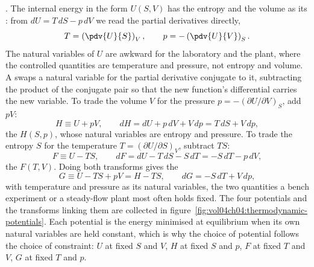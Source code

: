 . The internal energy in
the form $U(S,V)$ has the entropy and the volume as its : from $dU = T\,dS - p\,dV$ we read the partial derivatives directly,
\[
T = \left(\pdv{U}{S}\right)_V, \qquad
p = -\left(\pdv{U}{V}\right)_S.
\]
The natural variables of $U$ are awkward for the laboratory and the plant, where
the controlled quantities are temperature and pressure, not entropy and volume.
A  swaps a natural variable for the partial
derivative conjugate to it, subtracting the product of the conjugate pair so that
the new function's differential carries the new variable. To trade the volume $V$
for the pressure $p = -(\partial U/\partial V)_S$, add $pV$:
\[
H \equiv U + pV, \qquad
dH = dU + p\,dV + V\,dp = T\,dS + V\,dp,
\]
the  $H(S,p)$, whose natural variables are entropy and
pressure. To trade the entropy $S$ for the temperature $T = (\partial
U/\partial S)_V$, subtract $TS$:
\[
F \equiv U - TS, \qquad
dF = dU - T\,dS - S\,dT = -S\,dT - p\,dV,
\]
the  $F(T,V)$. Doing both transforms gives the
\[
G \equiv U - TS + pV = H - TS, \qquad
dG = -S\,dT + V\,dp,
\]
with temperature and pressure as its natural variables, the two quantities a
bench experiment or a steady-flow plant most often holds fixed. The four
potentials and the transforms linking them are collected in
figure~\ref{fig:vol04ch04:thermodynamic-potentials}. Each potential is the
energy minimised at equilibrium when its own natural variables are held constant,
which is why the choice of potential follows the choice of constraint: $U$ at
fixed $S$ and $V$, $H$ at fixed $S$ and $p$, $F$ at fixed $T$ and $V$, $G$ at
fixed $T$ and $p$.



